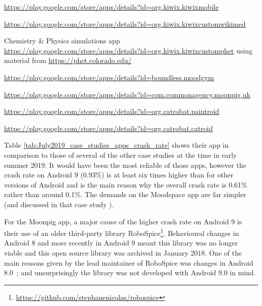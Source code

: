 \begin{table}
\begin{threeparttable}
\begin{tablenotes}
\footnotesize
\item [1]\url{https://play.google.com/store/apps/details?id=org.kiwix.kiwixmobile}
\item [2]\url{https://play.google.com/store/apps/details?id=org.kiwix.kiwixcustomwikimed}
\item [3]Chemistry \& Physics simulations app \url{https://play.google.com/store/apps/details?id=org.kiwix.kiwixcustomphet} using material from \url{https://phet.colorado.edu/}  
\item [4]\url{https://play.google.com/store/apps/details?id=boundless.moodgym}
\item [5]\url{https://play.google.com/store/apps/details?id=com.commonagency.moonpig.uk}
\item [6]\url{https://play.google.com/store/apps/details?id=org.catrobat.paintroid}
\item[7]\url{https://play.google.com/store/apps/details?id=org.catrobat.catroid}
\end{tablenotes}
\end{threeparttable}
\end{table}


Table \ref{tab:July2019_case_studies_apps_crash_rate} shows their app in comparison to those of several of the other case studies at the time in early summer 2019. It would have been the most reliable of those apps, however the crash rate on Android 9 (0.93\%) is at least six times higher than for other versions of Android and is the main reason why the overall crash rate is 0.61\% rather than around 0.1\%. The demands on the Moodspace app are far simpler (and discussed in that case study ). %

For the Moonpig app, a major cause of the higher crash rate on Android 9 is their use of an older third-party library RoboSpice\footnote{\url{https://github.com/stephanenicolas/robospice}}. Behavioural changes in Android 8 and more recently in Android 9 meant this library was no longer viable and this open source library was archived in January 2018. One of the main reasons given by the lead maintainer of RoboSpice was changes in Android 8.0~\citep{Robospice01}; and unsurprisingly the library was not developed with Android 9.0 in mind. 

